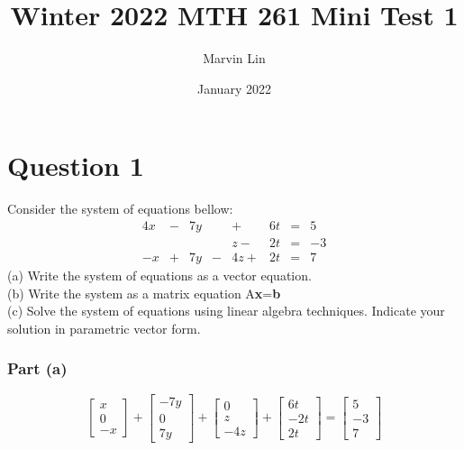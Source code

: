 \documentclass{report}
\title{Winter 2022 MTH 261 Mini Test 1}
\author{Marvin Lin}
\date{January 2022}
\begin{document}
\maketitle

\section*{Question 1}

\begin{mybox}
Consider the system of equations bellow:
\begin{alignat*}{4}
 x & {}-{} & 7y & {} {} &    {}+{} & 6t & {}={} &  5 \\
   & {} {} &    & {} {} &  z {}-{} & 2t & {}={} & -3 \\
-x & {}+{} & 7y & {}-{} & 4z {}+{} & 2t & {}={} &  7
\end{alignat*}
(a) Write the system of equations as a vector equation.\\
(b) Write the system as a matrix equation A\textbf{x}=\textbf{b}\\
(c) Solve the system of equations using linear algebra techniques. Indicate your solution in parametric vector form.
\end{mybox}

\subsubsection*{Part (a)}
\begin{equation}
\begin{bmatrix} x \\ 0 \\ -x \end{bmatrix}
+
\begin{bmatrix} -7y \\ 0 \\ 7y \end{bmatrix}
+
\begin{bmatrix} 0 \\ z \\ -4z \end{bmatrix}
+
\begin{bmatrix} 6t \\ -2t \\ 2t \end{bmatrix}
=
\begin{bmatrix} 5 \\ -3 \\ 7 \end{bmatrix}
\end{equation}
\end{document}
